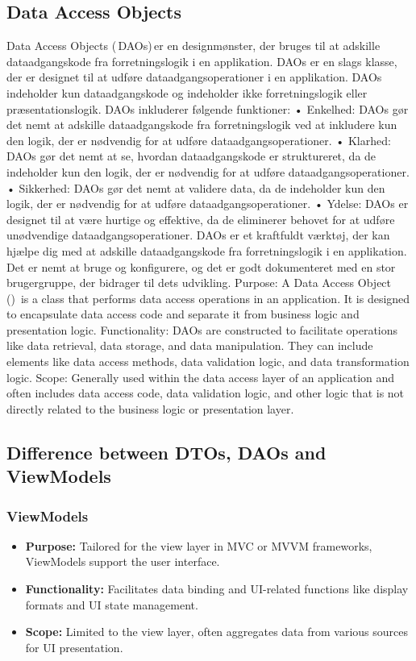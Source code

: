 \subsection{Data Access Objects}
Data Access Objects (\,DAOs)\,er en designmønster, der bruges til at adskille dataadgangskode fra forretningslogik i en applikation. DAOs er en slags klasse, der er designet til at udføre dataadgangsoperationer i en applikation. 
DAOs indeholder kun dataadgangskode og indeholder ikke forretningslogik eller præsentationslogik.
DAOs inkluderer følgende funktioner:
•	Enkelhed: DAOs gør det nemt at adskille dataadgangskode fra forretningslogik ved at inkludere kun den logik, der er nødvendig for at udføre dataadgangsoperationer.
•	Klarhed: DAOs gør det nemt at se, hvordan dataadgangskode er struktureret, da de indeholder kun den logik, der er nødvendig for at udføre dataadgangsoperationer.
•	Sikkerhed: DAOs gør det nemt at validere data, da de indeholder kun den logik, der er nødvendig for at udføre dataadgangsoperationer.
•	Ydelse: DAOs er designet til at være hurtige og effektive, da de eliminerer behovet for at udføre unødvendige dataadgangsoperationer.
DAOs er et kraftfuldt værktøj, der kan hjælpe dig med at adskille dataadgangskode fra forretningslogik i en applikation. Det er nemt at bruge og konfigurere, og det er godt dokumenteret med en stor brugergruppe, der bidrager til dets udvikling.
Purpose: A Data Access Object (\DAO)\ is a class that performs data access operations in an application. It is designed to encapsulate data access code and separate it from business logic and presentation logic.
Functionality: DAOs are constructed to facilitate operations like data retrieval, data storage, and data manipulation. They can include elements like data access methods, data validation logic, and data transformation logic.
Scope: Generally used within the data access layer of an application and often includes data access code, data validation logic, and other logic that is not directly related to the business logic or presentation layer.

\subsection{Difference between DTOs, DAOs and ViewModels}

\subsubsection{ViewModels}
\begin{itemize}
    \item \textbf{Purpose:} Tailored for the view layer in MVC or MVVM frameworks, ViewModels support the user interface.
    \item \textbf{Functionality:} Facilitates data binding and UI-related functions like display formats and UI state management.
    \item \textbf{Scope:} Limited to the view layer, often aggregates data from various sources for UI presentation.
\end{itemize}

